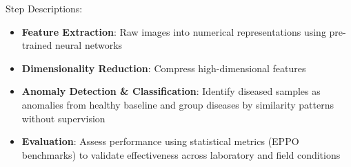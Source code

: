 \documentclass[aspectratio=43]{beamer}
\begin{document}
\begin{frame}
\begin{columns}
\begin{column}{0.6\textwidth}
\begin{block}{\small Step Descriptions:}
\begin{itemize}
                    \vspace{0.3cm}
                    \item \textbf{Feature Extraction}: Raw images into numerical representations using pre-trained neural networks
                    
                    \vspace{0.3cm}
                    \item \textbf{Dimensionality Reduction}: Compress high-dimensional features
                    
                    \vspace{0.3cm}
                    \item \textbf{Anomaly Detection \& Classification}: Identify diseased samples as anomalies from healthy baseline and group diseases by similarity patterns without supervision
                    
                    \vspace{0.3cm}
                    \item \textbf{Evaluation}: Assess performance using statistical metrics (EPPO benchmarks) to validate effectiveness across laboratory and field conditions
                \end{itemize}
            \end{block}
        \end{column}
    \end{columns}
\end{frame}
\end{document}
